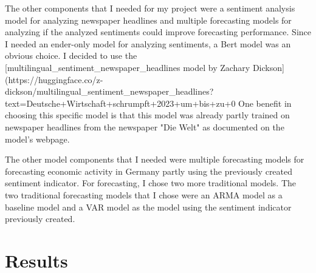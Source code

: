 \documentclass[11pt, a4paper, leqno]{article}
\begin{document}
The other components that I needed for my project were a sentiment analysis model for analyzing newspaper headlines and multiple forecasting models for analyzing if the analyzed sentiments could improve forecasting performance. Since I needed an ender-only model for analyzing sentiments, a Bert model was an obvious choice. I decided to use the [multilingual_sentiment_newspaper_headlines model by Zachary Dickson](https://huggingface.co/z-dickson/multilingual_sentiment_newspaper_headlines?text=Deutsche+Wirtschaft+schrumpft+2023+um+bis+zu+0%
One benefit in choosing this specific model is that this model was already partly trained on newspaper headlines from the newspaper "Die Welt" as documented on the model's webpage.

The other model components that I needed were multiple forecasting models for forecasting economic activity in Germany partly using the previously created sentiment indicator. For forecasting, I chose two more traditional models. The two traditional forecasting models that I chose were an ARMA model as a baseline model and a VAR model as the model using the sentiment indicator previously created.

\section{Results}
\end{document}
